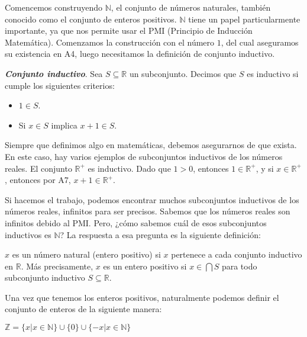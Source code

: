 \documentclass{report}
\begin{document}
    Comencemos construyendo $\mathbb{N}$, el conjunto de números naturales, también conocido como el conjunto de enteros positivos. $\mathbb{N}$ tiene un papel particularmente importante, ya que nos permite usar el PMI (Principio de Inducción Matemática). Comenzamos la construcción con el número $1$, del cual aseguramos su existencia en A4, luego necesitamos la definición de conjunto inductivo.
    
    \begin{defBox}
        \textit{\textbf{Conjunto inductivo}}. Sea $S \subseteq \mathbb{R}$ un subconjunto. Decimos que $S$ es inductivo si cumple los siguientes criterios:
    
        \begin{itemize}
            \item $1 \in S$.
            \item Si $x \in S$ implica $x+1 \in S$.
        \end{itemize}
    \end{defBox}
    
    \begin{noteBox}
        Siempre que definimos algo en matemáticas, debemos asegurarnos de que exista. En este caso, hay varios ejemplos de subconjuntos inductivos de los números reales. El conjunto $\mathbb{R}^+$ es inductivo. Dado que $1>0$, entonces $1 \in \mathbb{R}^+$, y si $x \in \mathbb{R}^+$, entonces por A7, $x+1 \in \mathbb{R}^+$.
    \end{noteBox}
    
    Si hacemos el trabajo, podemos encontrar muchos subconjuntos inductivos de los números reales, infinitos para ser precisos. Sabemos que los números reales son infinitos debido al PMI. Pero, ¿cómo sabemos cuál de esos subconjuntos inductivos es $\mathbb{N}$? La respuesta a esa pregunta es la siguiente definición:
    
    \begin{defBox}
        $x$ es un número natural (entero positivo) si $x$ pertenece a cada conjunto inductivo en $\mathbb{R}$. Más precisamente, $x$ es un entero positivo si $x \in \bigcap S$ para todo subconjunto inductivo $S \subseteq \mathbb{R}$.
    \end{defBox}
    
    Una vez que tenemos los enteros positivos, naturalmente podemos definir el conjunto de enteros de la siguiente manera:
    
    \begin{defBox}
        $\mathbb{Z} = \{x | x \in \mathbb{N}\} \cup \{0\} \cup \{-x | x \in \mathbb{N}\}$
    \end{defBox}
\end{document}
